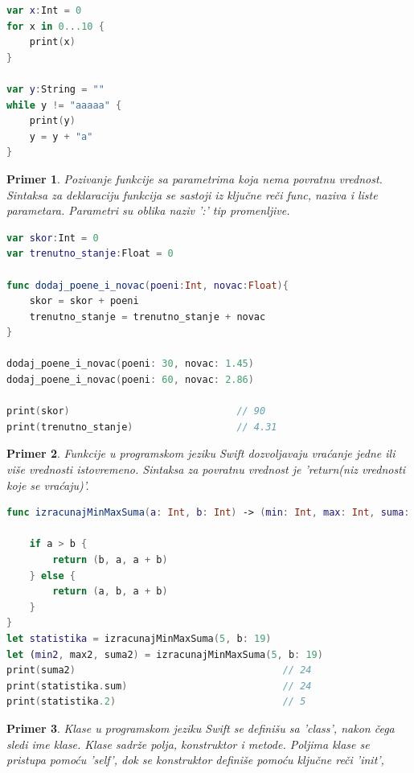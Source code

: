 \documentclass[a4paper]{article}
\newtheorem{primer}{Primer}[section]
\begin{document}
\begin{lstlisting}[language=Swift, caption={Petlje},frame=single, label=simple]
var x:Int = 0
for x in 0...10 {
	print(x)
}

var y:String = ""
while y != "aaaaa" {
	print(y)
	y = y + "a"
}
\end{lstlisting}

\begin{primer}
Pozivanje funkcije sa parametrima koja nema povratnu vrednost. Sintaksa za deklaraciju funkcija se sastoji iz ključne reči func, naziva i liste parametara. Parametri su oblika naziv ':' tip promenljive.
\end{primer}

\begin{lstlisting}[language=Swift, caption={Funkcije bez povratne vrednosti},frame=single, label=simple]
var skor:Int = 0
var trenutno_stanje:Float = 0

func dodaj_poene_i_novac(poeni:Int, novac:Float){
	skor = skor + poeni
	trenutno_stanje = trenutno_stanje + novac
}

dodaj_poene_i_novac(poeni: 30, novac: 1.45)
dodaj_poene_i_novac(poeni: 60, novac: 2.86)

print(skor)								// 90
print(trenutno_stanje)					// 4.31
\end{lstlisting}

\begin{primer}
Funkcije u programskom jeziku Swift dozvoljavaju vraćanje jedne ili više vrednosti istovremeno. Sintaksa za povratnu vrednost je 'return(niz vrednosti koje se vraćaju)'.
\end{primer}

\begin{lstlisting}[language=Swift, caption={Funkcije koje imaju povratnu vrednost},frame=single, label=simple]
func izracunajMinMaxSuma(a: Int, b: Int) -> (min: Int, max: Int, suma: Int) {
    
    if a > b {
        return (b, a, a + b)
    } else {
        return (a, b, a + b)
    }
}
let statistika = izracunajMinMaxSuma(5, b: 19)
let (min2, max2, suma2) = izracunajMinMaxSuma(5, b: 19)
print(suma2)            						// 24
print(statistika.sum)   						// 24
print(statistika.2)								// 5     
\end{lstlisting}

\begin{primer}
Klase u programskom jeziku Swift se definišu sa 'class', nakon čega sledi ime klase. Klase sadrže polja, konstruktor i metode. Poljima klase se pristupa pomoću 'self', dok se konstruktor definiše pomoću ključne reči 'init',
\end{primer}
\end{document}
